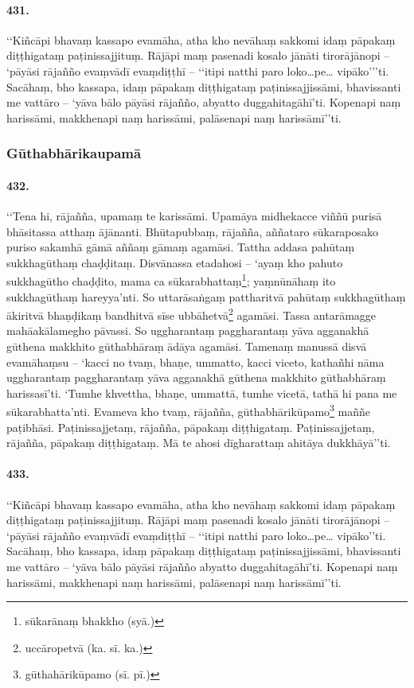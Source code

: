 \paragraph{431.} ‘‘Kiñcāpi bhavaṃ kassapo evamāha, atha kho nevāhaṃ sakkomi idaṃ pāpakaṃ diṭṭhigataṃ paṭinissajjituṃ. Rājāpi maṃ pasenadi kosalo jānāti tirorājānopi – ‘pāyāsi rājañño evaṃvādī evaṃdiṭṭhī – ‘‘itipi natthi paro loko…pe… vipāko’’’ti. Sacāhaṃ, bho kassapa, idaṃ pāpakaṃ diṭṭhigataṃ paṭinissajjissāmi, bhavissanti me vattāro – ‘yāva bālo pāyāsi rājañño, abyatto duggahitagāhī’ti. Kopenapi naṃ harissāmi, makkhenapi naṃ harissāmi, palāsenapi naṃ harissāmī’’ti.

\subsubsection{Gūthabhārikaupamā}

\paragraph{432.} ‘‘Tena hi, rājañña, upamaṃ te karissāmi. Upamāya midhekacce viññū purisā bhāsitassa atthaṃ ājānanti. Bhūtapubbaṃ, rājañña, aññataro sūkaraposako puriso sakamhā gāmā aññaṃ gāmaṃ agamāsi. Tattha addasa pahūtaṃ sukkhagūthaṃ chaḍḍitaṃ. Disvānassa etadahosi – ‘ayaṃ kho pahuto sukkhagūtho chaḍḍito, mama ca sūkarabhattaṃ\footnote{sūkarānaṃ bhakkho (syā.)}; yaṃnūnāhaṃ ito sukkhagūthaṃ hareyya’nti. So uttarāsaṅgaṃ pattharitvā pahūtaṃ sukkhagūthaṃ ākiritvā bhaṇḍikaṃ bandhitvā sīse ubbāhetvā\footnote{uccāropetvā (ka. sī. ka.)} agamāsi. Tassa antarāmagge mahāakālamegho pāvassi. So uggharantaṃ paggharantaṃ yāva agganakhā gūthena makkhito gūthabhāraṃ ādāya agamāsi. Tamenaṃ manussā disvā evamāhaṃsu – ‘kacci no tvaṃ, bhaṇe, ummatto, kacci viceto, kathañhi nāma uggharantaṃ paggharantaṃ yāva agganakhā gūthena makkhito gūthabhāraṃ harissasī’ti. ‘Tumhe khvettha, bhaṇe, ummattā, tumhe vicetā, tathā hi pana me sūkarabhatta’nti. Evameva kho tvaṃ, rājañña, gūthabhārikūpamo\footnote{gūthahārikūpamo (sī. pī.)} maññe paṭibhāsi. Paṭinissajjetaṃ, rājañña, pāpakaṃ diṭṭhigataṃ. Paṭinissajjetaṃ, rājañña, pāpakaṃ diṭṭhigataṃ. Mā te ahosi dīgharattaṃ ahitāya dukkhāyā’’ti.

\paragraph{433.} ‘‘Kiñcāpi bhavaṃ kassapo evamāha, atha kho nevāhaṃ sakkomi idaṃ pāpakaṃ diṭṭhigataṃ paṭinissajjituṃ. Rājāpi maṃ pasenadi kosalo jānāti tirorājānopi – ‘pāyāsi rājañño evaṃvādī evaṃdiṭṭhī – ‘‘itipi natthi paro loko…pe… vipāko’’ti. Sacāhaṃ, bho kassapa, idaṃ pāpakaṃ diṭṭhigataṃ paṭinissajjissāmi, bhavissanti me vattāro – ‘yāva bālo pāyāsi rājañño abyatto duggahitagāhī’ti. Kopenapi naṃ harissāmi, makkhenapi naṃ harissāmi, palāsenapi naṃ harissāmī’’ti.


